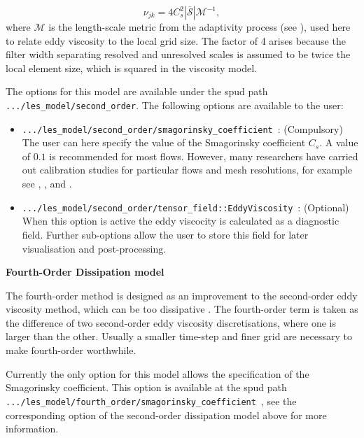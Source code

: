 \begin{equation}
\nu_{jk} = 4C_s^2 \left | \mathcal{\overline{S}} \right | \mathcal{M}^{-1},
\end{equation}
where $\mathcal{M}$ is the length-scale metric from the adaptivity process (see \citet{pain2001}),
used here to relate eddy viscosity to the local grid size. The factor of 4 arises because the filter
width separating resolved and unresolved scales is assumed to be twice the local element size, which is squared in
the viscosity model.
\par
The options for this model are available under the spud path 
\lstinline+.../les_model/second_order+. The following options are available to the user:
\begin{itemize}
\item \lstinline+.../les_model/second_order/smagorinsky_coefficient+\ : (Compulsory) The user can here
      specify the value of the Smagorinsky coefficient $C_s$. A value of $0.1$ is recommended for most flows.
      However, many researchers have carried out calibration studies for particular flows and mesh
      resolutions, for example see \cite{deardorff1971}, \cite{nicoud1999}, \cite{germano1991} and
      \cite{canuto_cheng1997}.
\item \lstinline+.../les_model/second_order/tensor_field::EddyViscosity+\ : (Optional) When this
      option is active the eddy viscocity is calculated as a diagnostic field. Further sub-options
      allow the user to store this field for later visualisation and post-processing.
\end{itemize}

\par{\textbf{Fourth-Order Dissipation model}\\}
\label{sec:fourth_order_diss_LES}

The fourth-order method is designed as an improvement to the second-order eddy viscosity method, which can be too dissipative \citep{adam}. The fourth-order term is taken as the difference of two second-order eddy viscosity discretisations, where one is larger than the other. Usually a smaller time-step and finer grid are necessary to make fourth-order worthwhile.
\par
Currently the only option for this model allows the specification of the Smagorinsky coefficient. This option 
is available at the spud path \lstinline+.../les_model/fourth_order/smagorinsky_coefficient+\ , see the
corresponding option of the second-order dissipation model above for more information.

